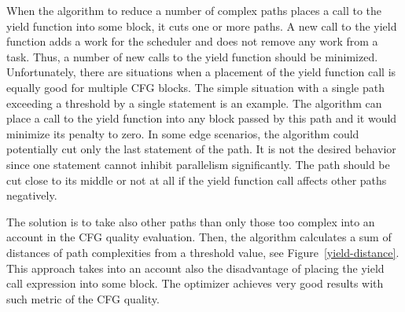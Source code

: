 \pagebreak
When the algorithm to reduce a number of complex paths places a call to the yield function into some block, it cuts one or more paths. A new call to the yield function adds a work for the scheduler and does not remove any work from a task. Thus, a number of new calls to the yield function should be minimized. Unfortunately, there are situations when a placement of the yield function call is equally good for multiple CFG blocks. The simple situation with a single path exceeding a threshold by a single statement is an example. The algorithm can place a call to the yield function into any block passed by this path and it would minimize its penalty to zero. In some edge scenarios, the algorithm could potentially cut only the last statement of the path. It is not the desired behavior since one statement cannot inhibit parallelism significantly. The path should be cut close to its middle or not at all if the yield function call affects other paths negatively.

The solution is to take also other paths than only those too complex into an account in the CFG quality evaluation. Then, the algorithm calculates a sum of distances of path complexities from a threshold value, see Figure~\ref{yield-distance}. This approach takes into an account also the disadvantage of placing the yield call expression into some block. The optimizer achieves very good results with such metric of the CFG quality.

